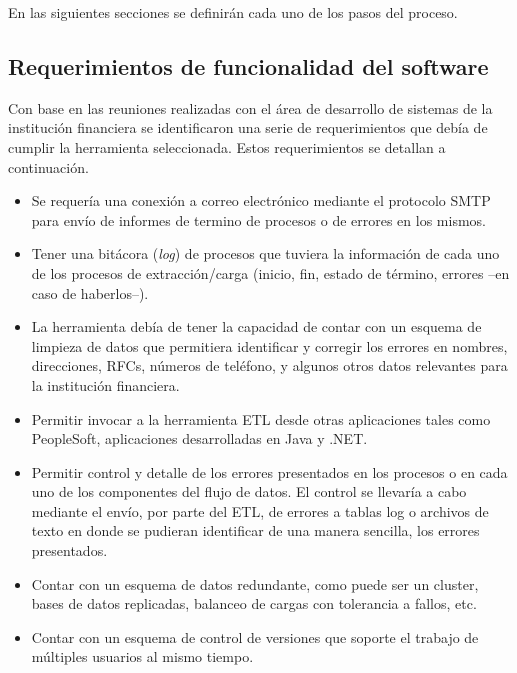 En las siguientes secciones se definirán cada uno de los pasos del proceso.

\subsection{Requerimientos de funcionalidad del software}

Con base en las reuniones realizadas con el área de desarrollo de sistemas de la
institución financiera se identificaron una serie de requerimientos que debía de cumplir la herramienta seleccionada.
Estos requerimientos se detallan a continuación.

\begin{itemize}

\item Se requería una conexión a correo electrónico mediante el protocolo SMTP
  para envío de informes de termino de procesos o de errores en los mismos.

\item Tener una bitácora (\emph{log}) de procesos que tuviera la información de
  cada uno de los procesos de extracción/carga (inicio, fin, estado de término,
  errores --en caso de haberlos--).

\item La herramienta debía de tener la capacidad de contar con un esquema de
  limpieza de datos que permitiera identificar y corregir los errores en
  nombres, direcciones, RFCs, números de teléfono, y algunos otros datos
  relevantes para la institución financiera.

\item Permitir invocar a la herramienta ETL desde otras aplicaciones tales como
  PeopleSoft, aplicaciones desarrolladas en Java y .NET.

\item Permitir control y detalle de los errores presentados en los procesos o en
  cada uno de los componentes del flujo de datos. El control se llevaría a cabo
  mediante el envío, por parte del ETL, de errores a tablas log o archivos de
  texto en donde se pudieran identificar de una manera sencilla, los errores
  presentados.

\item Contar con un esquema de datos redundante, como puede ser un cluster,
  bases de datos replicadas, balanceo de cargas con tolerancia a fallos, etc.

\item Contar con un esquema de control de versiones que soporte el trabajo de
  múltiples usuarios al mismo tiempo.


\end{itemize}
